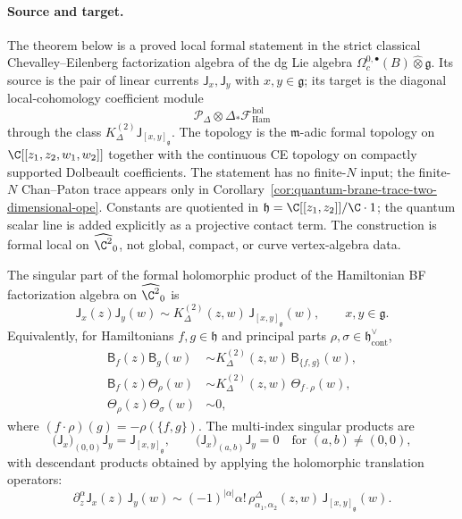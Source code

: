 \paragraph{Source and target.}
The theorem below is a proved local formal statement in the strict
classical Chevalley--Eilenberg factorization algebra of the dg Lie
algebra
\(\Omega_c^{0,\bullet}(B)\widehat\otimes\mathfrak g\).  Its source is
the pair of linear currents
\(\mathsf J_x,\mathsf J_y\) with \(x,y\in\mathfrak g\); its target is the
diagonal local-cohomology coefficient module
\[
  \mathcal P_\Delta\otimes\Delta_*
  \mathcal F_{\mathrm{Ham}}^{\mathrm{hol}}
\]
through the class
\(K^{(2)}_\Delta\mathsf J_{[x,y]_{\mathfrak g}}\).  The topology is the
\(\mathfrak m\)-adic formal topology on
\(\C[[z_1,z_2,w_1,w_2]]\) together with the continuous CE topology on
compactly supported Dolbeault coefficients.  The statement has no
finite-\(N\) input; the finite-\(N\) Chan--Paton trace appears only in
Corollary~\ref{cor:quantum-brane-trace-two-dimensional-ope}.  Constants
are quotiented in
\(\mathfrak h=\C[[z_1,z_2]]/\C\cdot1\); the quantum scalar line is added
explicitly as a projective contact term.  The construction is formal
local on \(\widehat{\C^2}_0\), not global, compact, or curve
vertex-algebra data.

\begin{thm}
\label{thm:formal-two-dimensional-holomorphic-ope}
The singular part of the formal holomorphic product of the Hamiltonian BF
factorization algebra on \(\widehat{\C^2}_0\) is
\[
  \mathsf{J}_x(z)\mathsf{J}_y(w)
  \sim
  K^{(2)}_\Delta(z,w)\,\mathsf{J}_{[x,y]_{\mathfrak g}}(w),
  \qquad x,y\in\mathfrak g .
\]
Equivalently, for Hamiltonians \(f,g\in\mathfrak h\) and principal
parts \(\rho,\sigma\in\mathfrak h^\vee_{\mathrm{cont}}\),
\[
\begin{aligned}
  \mathsf{B}_f(z)\mathsf{B}_g(w)
  &\sim
  K^{(2)}_\Delta(z,w)\,\mathsf{B}_{\{f,g\}}(w),\\
  \mathsf{B}_f(z)\mathsf{\Theta}_\rho(w)
  &\sim
  K^{(2)}_\Delta(z,w)\,\mathsf{\Theta}_{f\cdot\rho}(w),\\
  \mathsf{\Theta}_\rho(z)\mathsf{\Theta}_\sigma(w)
  &\sim 0,
\end{aligned}
\]
where \((f\cdot\rho)(g)=-\rho(\{f,g\})\).  The multi-index singular
products are
\[
  \bigl(\mathsf{J}_x\bigr)_{(0,0)}\mathsf{J}_y
  =
  \mathsf{J}_{[x,y]_{\mathfrak g}},
  \qquad
  \bigl(\mathsf{J}_x\bigr)_{(a,b)}\mathsf{J}_y=0
  \quad\text{for }(a,b)\ne(0,0),
\]
with descendant products obtained by applying the holomorphic
translation operators:
\[
  \partial_z^\alpha\mathsf{J}_x(z)\,\mathsf{J}_y(w)
  \sim
  (-1)^{|\alpha|}\alpha!\,
  \rho^\Delta_{\alpha_1,\alpha_2}(z,w)\,
  \mathsf{J}_{[x,y]_{\mathfrak g}}(w).
\]
\end{thm}

